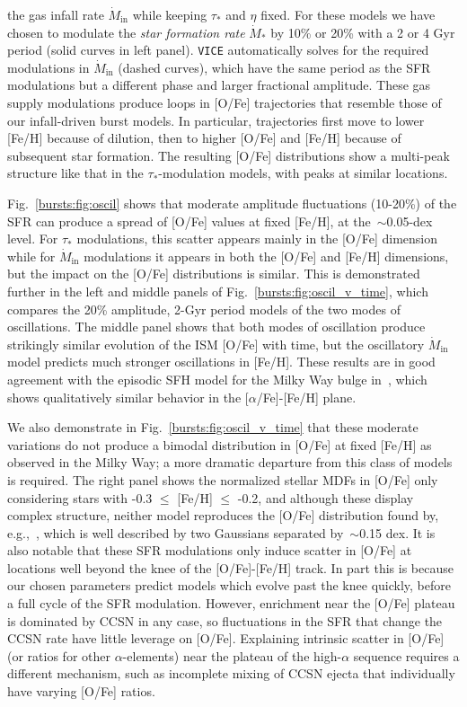 the gas infall rate $\dot{M}_\text{in}$ while keeping $\tau_*$ and $\eta$ 
fixed. For these models we have chosen to modulate the \textit{star formation 
rate} $\dot{M}_*$ by 10\% or 20\% with a 2 or 4 Gyr period (solid curves in 
left panel). \texttt{VICE} automatically solves for the required modulations in 
$\dot{M}_\text{in}$ (dashed curves), which have the same period as the SFR 
modulations but a different phase and larger fractional amplitude. These gas 
supply modulations produce loops in [O/Fe] trajectories that resemble those of 
our infall-driven burst models. In particular, trajectories first move to lower 
[Fe/H] because of dilution, then to higher [O/Fe] and [Fe/H] because of 
subsequent star formation. The resulting [O/Fe] distributions show a multi-peak 
structure like that in the $\tau_*$-modulation models, with peaks at similar 
locations. 
\par 
Fig.~\ref{bursts:fig:oscil} shows that moderate amplitude fluctuations (10-20\%) of 
the SFR can produce a spread of [O/Fe] values at fixed [Fe/H], at 
the~$\sim$0.05-dex level. For $\tau_*$ modulations, this scatter appears 
mainly in the [O/Fe] dimension while for $\dot{M}_\text{in}$ modulations it 
appears in both the [O/Fe] and [Fe/H] dimensions, but the impact on the [O/Fe] 
distributions is similar. This is demonstrated further in the left and middle 
panels of Fig.~\ref{bursts:fig:oscil_v_time}, which compares the 20\% amplitude, 2-Gyr 
period models of the two modes of oscillations. The middle panel shows that 
both modes of oscillation produce strikingly similar evolution of the ISM 
[O/Fe] with time, but the oscillatory $\dot{M}_\text{in}$ model predicts much 
stronger oscillations in [Fe/H]. 
These results are in good agreement with the episodic SFH model for the 
Milky Way bulge in~\citet{Matteucci2019}, which shows qualitatively similar 
behavior in the [$\alpha$/Fe]-[Fe/H] plane. 
\par 
We also demonstrate in Fig.~\ref{bursts:fig:oscil_v_time} that these moderate 
variations do not produce a bimodal distribution in [O/Fe] at fixed [Fe/H] 
as observed in the Milky Way; a more dramatic departure from this class of 
models is required. The right panel shows the normalized stellar MDFs in [O/Fe] 
only considering stars with -0.3 $\leq$ [Fe/H] $\leq$ -0.2, and although these 
display complex structure, neither model reproduces the [O/Fe] distribution 
found by, e.g.,~\citet{BertranDeLis2016}, which is well described by two 
Gaussians separated by~$\sim$0.15 dex. It is also notable that these SFR 
modulations only induce scatter in [O/Fe] at locations well beyond the knee 
of the [O/Fe]-[Fe/H] track. In part this is because our chosen parameters 
predict models which evolve past the knee quickly, before a full cycle of the 
SFR modulation. However, enrichment near the [O/Fe] plateau is dominated by 
CCSN in any case, so fluctuations in the SFR that change the CCSN rate have 
little leverage on [O/Fe]. Explaining intrinsic scatter in [O/Fe] (or ratios 
for other $\alpha$-elements) near the plateau of the high-$\alpha$ sequence 
requires a different mechanism, such as incomplete mixing of CCSN ejecta that 
individually have varying [O/Fe] ratios. 

